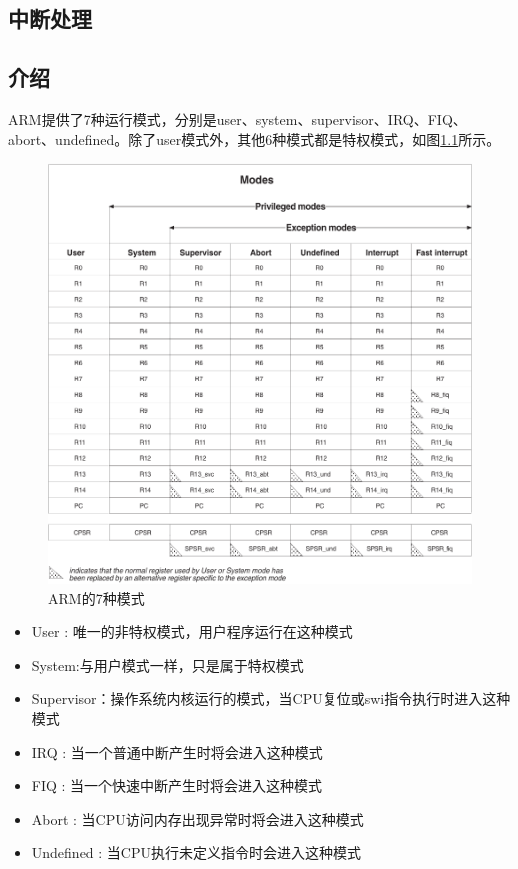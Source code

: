 \documentclass[main.tex]{subfiles}
\begin{document}
\ifxetex\else
\begin{CJK*}{UTF8}{song}
\fi

\chapter{中断处理}
\section{介绍}
ARM提供了7种运行模式，分别是user、system、supervisor、IRQ、FIQ、abort、undefined。除了user模式外，其他6种模式都是特权模式，如图\ref{figure:3-1}所示。

\begin{figure}[htp]
\centering
\includegraphics[scale=0.5]{figures/3-1.png}
\caption{ARM的7种模式}
\label{figure:3-1}
\end{figure}

\begin{itemize}
\item User : 唯一的非特权模式，用户程序运行在这种模式
\item System:与用户模式一样，只是属于特权模式
\item Supervisor：操作系统内核运行的模式，当CPU复位或swi指令执行时进入这种模式
\item IRQ :   当一个普通中断产生时将会进入这种模式
\item FIQ :   当一个快速中断产生时将会进入这种模式
\item Abort : 当CPU访问内存出现异常时将会进入这种模式
\item Undefined : 当CPU执行未定义指令时会进入这种模式
\end{itemize}


\end{CJK*}
\end{document}
